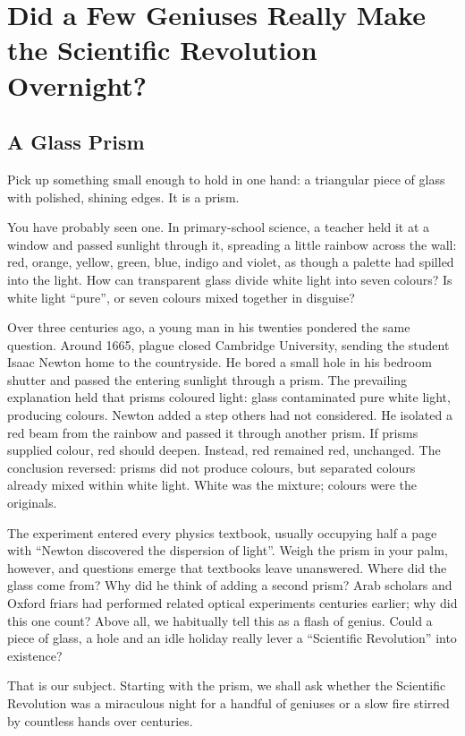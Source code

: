 \chapter[An Overnight Scientific Revolution?]{Did a Few Geniuses Really Make the Scientific Revolution Overnight?}
\section{A Glass Prism}
Pick up something small enough to hold in one hand: a triangular piece of glass with polished, shining edges. It is a prism.

You have probably seen one. In primary-school science, a teacher held it at a window and passed sunlight through it, spreading a little rainbow across the wall: red, orange, yellow, green, blue, indigo and violet, as though a palette had spilled into the light. How can transparent glass divide white light into seven colours? Is white light ``pure'', or seven colours mixed together in disguise?

Over three centuries ago, a young man in his twenties pondered the same question. Around 1665, plague closed Cambridge University, sending the student Isaac Newton home to the countryside. He bored a small hole in his bedroom shutter and passed the entering sunlight through a prism. The prevailing explanation held that prisms coloured light: glass contaminated pure white light, producing colours. Newton added a step others had not considered. He isolated a red beam from the rainbow and passed it through another prism. If prisms supplied colour, red should deepen. Instead, red remained red, unchanged. The conclusion reversed: prisms did not produce colours, but separated colours already mixed within white light. White was the mixture; colours were the originals.

The experiment entered every physics textbook, usually occupying half a page with ``Newton discovered the dispersion of light''. Weigh the prism in your palm, however, and questions emerge that textbooks leave unanswered. Where did the glass come from? Why did he think of adding a second prism? Arab scholars and Oxford friars had performed related optical experiments centuries earlier; why did this one count? Above all, we habitually tell this as a flash of genius. Could a piece of glass, a hole and an idle holiday really lever a ``Scientific Revolution'' into existence?

That is our subject. Starting with the prism, we shall ask whether the Scientific Revolution was a miraculous night for a handful of geniuses or a slow fire stirred by countless hands over centuries.

